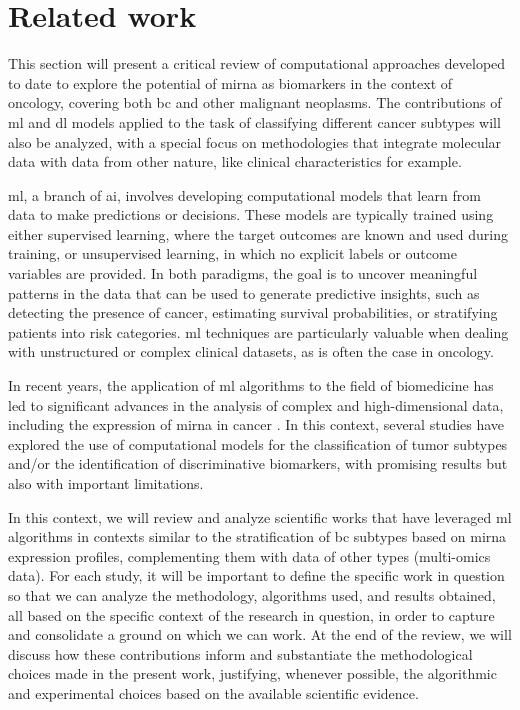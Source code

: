 
\newpage
\section{Related work}

This section will present a critical review of computational approaches
developed to date to explore the potential of \gls{mirna} as biomarkers in the
context of oncology, covering both \gls{bc} and other malignant neoplasms. The
contributions of \gls{ml} and \gls{dl} models applied to the task of
classifying different cancer subtypes will also be analyzed, with a special
focus on methodologies that integrate molecular data with data from other
nature, like clinical characteristics for example.

\gls{ml}, a branch of \gls{ai}, involves
developing computational models that learn from data to make predictions or
decisions. These models are typically trained using either supervised
learning, where the target outcomes are known and used during training, or
unsupervised learning, in which no explicit labels or outcome variables are
provided. In both paradigms, the goal is to uncover meaningful patterns in the
data that can be used to generate predictive insights, such as detecting the
presence of cancer, estimating survival probabilities, or stratifying patients
into risk categories. \gls{ml} techniques are particularly valuable when dealing with
unstructured or complex clinical datasets, as is often the case in oncology.

In recent years, the application of \gls{ml} algorithms to the field of
biomedicine has led to significant advances in the analysis of complex and
high-dimensional data, including the expression of \gls{mirna} in cancer
\cite{role_of_ai_giger2021}. In this context, several studies have explored the
use of computational models for the classification of tumor subtypes and/or the
identification of discriminative biomarkers, with promising results but also
with important limitations.

In this context, we will review and analyze scientific works that have
leveraged \gls{ml} algorithms in contexts similar to the stratification of
\gls{bc} subtypes based on \gls{mirna} expression profiles, complementing them
with data of other types (multi-omics data). For each study, it will be
important to define the specific work in question so that we can analyze the
methodology, algorithms used, and results obtained, all based on the specific
context of the research in question, in order to capture and consolidate a
ground on which we can work. At the end of the review, we will discuss how
these contributions inform and substantiate the methodological choices made in
the present work, justifying, whenever possible, the algorithmic and
experimental choices based on the available scientific evidence.

